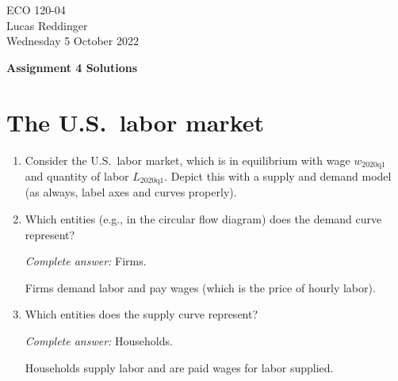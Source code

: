 \documentclass[
    letterpaper,paper=portrait,fleqn,
    DIV=16,fontsize=12pt,twoside=semi,
    parskip=full-,
    headings=standardclasses]
{scrartcl}
\begin{document}
\RaggedRight
\thispagestyle{plain}

ECO 120-04 \\
Lucas Reddinger \\
Wednesday 5 October 2022

\vspace{0.7\baselineskip}
\textbf{\LARGE Assignment 4 Solutions}

\section*{The U.S.~labor market}

\begin{enumerate}

\item Consider the U.S.~labor market, which is in equilibrium with wage $w_\text{2020q1}$ and quantity of labor $L_\text{2020q1}$. Depict this with a supply and demand model (as always, label axes and curves properly).

\begin{solution}
\begin{center}
\end{center}
\end{solution}

\item Which entities (e.g., in the circular flow diagram) does the demand curve represent?

\begin{solution}
\emph{Complete answer:} Firms.

Firms demand labor and pay wages (which is the price of hourly labor).
\end{solution}

\item Which entities does the supply curve represent?

\begin{solution}
\emph{Complete answer:} Households.

Households supply labor and are paid wages for labor supplied.
\end{solution}


\end{enumerate}
\end{document}
